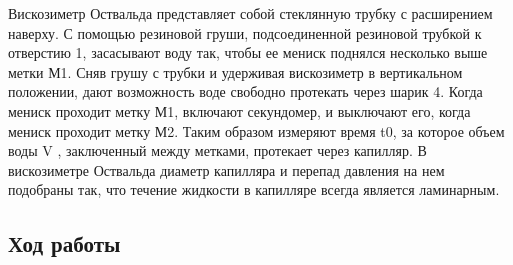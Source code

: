 \documentclass[a4paper]{article}
\begin{document}
    Вискозиметр Оствальда представляет собой стеклянную трубку с расширением наверху. С помощью резиновой груши, подсоединенной  резиновой трубкой к отверстию 1, засасывают воду так, чтобы ее мениск поднялся несколько выше метки М1. Сняв грушу с трубки и удерживая вискозиметр в вертикальном положении, дают возможность воде свободно протекать через шарик 4. Когда мениск проходит метку М1, включают секундомер, и выключают его, когда мениск проходит метку М2. Таким образом измеряют время t0, за которое объем воды V , заключенный между метками, протекает через капилляр. В вискозиметре Оствальда диаметр капилляра и перепад давления на нем подобраны так, что течение жидкости в капилляре всегда является ламинарным.
    
    \subsection{Ход работы}
\end{document}
